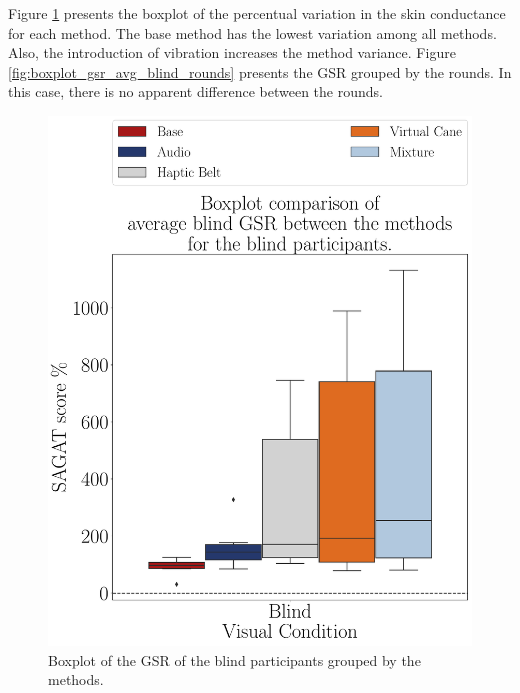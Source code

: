 Figure \ref{fig:boxplot_gsr_avg_blind_scene} presents the boxplot of the percentual variation in the skin conductance for each method. The base method has the lowest variation among all methods. Also, the introduction of vibration increases the method variance. Figure \ref{fig:boxplot_gsr_avg_blind_rounds} presents the GSR grouped by the rounds. In this case, there is no apparent difference between the rounds.

\begin{figure}[!htb]
    \centering
    \begin{minipage}{0.45\textwidth}
        \centering
        \includegraphics[width = \textwidth]{Resultados/GSR/Figuras/pdf/boxplot_gsr_avg_blind_scene.pdf}
        \caption{Boxplot of the GSR of the blind participants grouped by the methods.}
        \label{fig:boxplot_gsr_avg_blind_scene}
    \end{minipage}
    \begin{minipage}{0.075\textwidth}
        \hfill
    \end{minipage}
    \begin{minipage}{0.45\textwidth}

\end{minipage}
\end{figure}
